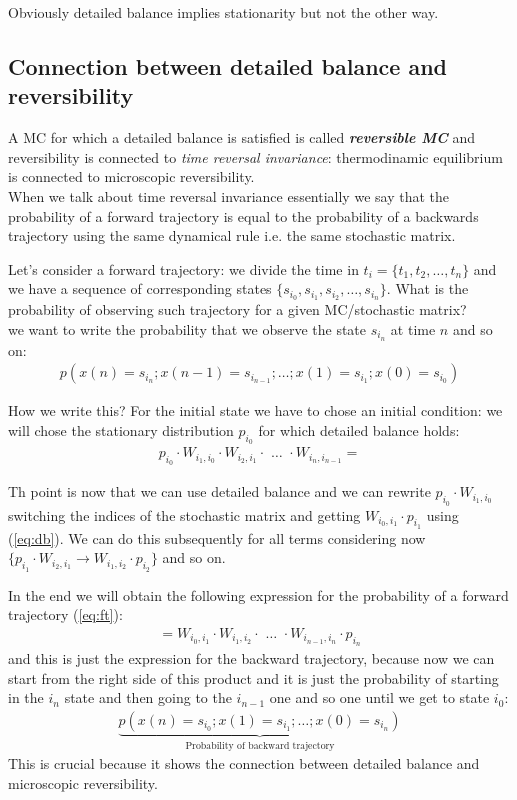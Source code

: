 \documentclass[\main/main.tex]{subfiles}
\begin{document}
Obviously detailed balance implies stationarity but not the other way.

\subsection{Connection between detailed balance and reversibility}
A MC for which a detailed balance is satisfied is called \textbf{\textit{reversible MC}} and reversibility is connected to \textit{time reversal invariance}: thermodinamic equilibrium is connected to microscopic reversibility. \\

When we talk about time reversal invariance essentially we say that the probability of a forward trajectory is equal to the probability of a backwards trajectory using the same dynamical rule i.e. the same stochastic matrix.

Let's consider a forward trajectory: we divide the time in $t_i=\{t_1,t_2, \dots, t_n\}$ and we have a sequence of corresponding states $\{s_{i_0}, s_{i_1},s_{i_2},\dots, s_{i_n}\}$. What is the probability of observing such trajectory for a given MC/stochastic matrix? \\

we want to write the probability that we observe the state $s_{i_n}$ at time $n$ and so on:
\begin{eqnarray}
   p (x(n)=s_{i_n}; x(n-1)=s_{i_{n-1}}; \dots; x(1)=s_{i_1}; x(0)=s_{i_0})
\end{eqnarray}

How we write this? For the initial state we have to chose an initial condition: we will chose the stationary distribution $p_{i_0}$ for which detailed balance holds:
\begin{eqnarray}
  {p_{i_0}}\cdot W_{i_1, i_0} \cdot W_{i_2,i_1} \cdot \,\,\dots \,\, \cdot W_{i_n,i_{n-1}} =
  \label{eq:ft}
\end{eqnarray}

Th point is now that we can use detailed balance and we can rewrite ${p_{i_0}}\cdot W_{i_1, i_0}$ switching the indices of the stochastic matrix and getting $W_{i_0, i_1}\cdot{p_{i_1}}$ using (\ref{eq:db}). 
We can do this subsequently for all terms considering now  $\{{p_{i_1}}\cdot W_{i_2, i_1} \to W_{i_1, i_2}\cdot {p_{i_2}}\}$ and so on.

In the end we will obtain the following expression for the probability of a forward trajectory (\ref{eq:ft}):
\begin{align}
    = W_{i_0, i_1} \cdot W_{i_1, i_2} \cdot\,\, \dots\,\, \cdot W_{i_{n-1}, i_n} \cdot p_{i_n}
\end{align}
and this is just the expression for the backward trajectory, because now we can start from the right side of this product and it is just the probability of starting in the $i_n$ state and then going to the $i_{n-1}$ one and so one until we get to state $i_{0}$:
\begin{eqnarray}
  \underbrace{p (x(n)=s_{i_0}; x(1)=s_{i_{1}}; \dots; x(0)=s_{i_n})}_{\text{Probability of backward trajectory}}
\end{eqnarray}
This is crucial because it shows the connection between detailed balance and microscopic reversibility.
\end{document}
